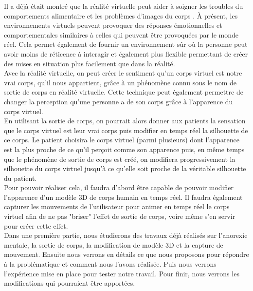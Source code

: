 \documentclass[11pt]{article}
\begin{document}
Il a déjà était montré que la réalité virtuelle peut aider à soigner les troubles du comportements alimentaire et les problèmes d'images du corps \cite{ri11}\cite{ri13}. \`{A} présent, les environnements virtuels peuvent provoquer des réponses émotionnelles et comportementales similaires à celles qui peuvent être provoquées par le monde réel. Cela permet également de fournir un environnement sûr où la personne peut avoir moins de réticence à interagir et également plus flexible permettant de créer des mises en situation plus facilement que dans la réalité.\\

Avec la réalité virtuelle, on peut créer le sentiment qu'un corps virtuel est notre vrai corps, qu'il nous appartient, grâce à un phénomène connu sous le nom de sortie de corps en réalité virtuelle. Cette technique peut également permettre de changer la perception qu'une personne a de son corps grâce à l'apparence du corps virtuel.\\

En utilisant la sortie de corps, on pourrait alors donner aux patients la sensation que le corps virtuel est leur vrai corps puis modifier en temps réel la silhouette de ce corps. Le patient choisira le corps virtuel (parmi plusieurs) dont l'apparence est la plus proche de ce qu'il perçoit comme son apparence puis, en même temps que le phénomène de sortie de corps est créé, on modifiera progressivement la silhouette du corps virtuel jusqu'à ce qu'elle soit proche de la véritable silhouette du patient.\\

Pour pouvoir réaliser cela, il faudra d'abord être capable de pouvoir modifier l'apparence d'un modèle 3D de corps humain en temps réel. Il faudra également capturer les mouvements de l'utilisateur pour animer en temps réel le corps virtuel afin de ne pas "briser" l'effet de sortie de corps, voire même s'en servir pour créer cette effet.\\

Dans une première partie, nous étudierons des travaux déjà réalisés sur l'anorexie mentale, la sortie de corps, la modification de modèle 3D et la capture de mouvement. Ensuite nous verrons en détails ce que nous proposons pour répondre à la problématique et comment nous l'avons réalisée. Puis nous verrons l'expérience mise en place pour tester notre travail. Pour finir, nous verrons les modifications qui pourraient être apportées.






\newpage 
\end{document}

